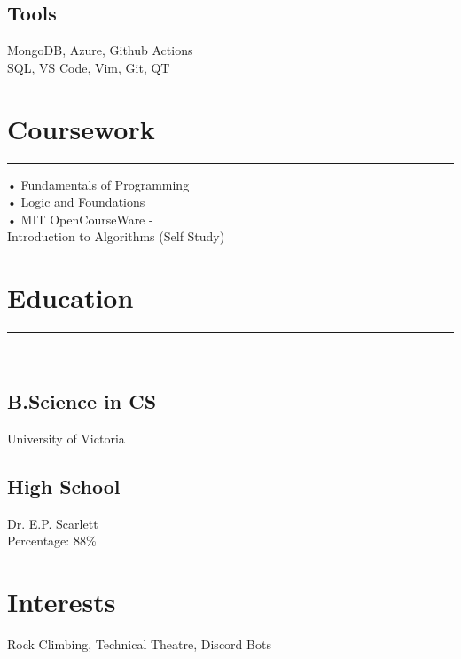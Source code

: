 \documentclass[]{rahulworld-resume}
\begin{document}
\begin{minipage}[t]{0.33\textwidth}
\subsection{Tools}
MongoDB, Azure, Github Actions \\ SQL, VS Code, Vim, Git, QT
\sectionsep
\section{Coursework}
\noindent\rule{5cm}{0.4pt}

• Fundamentals of Programming\\
• Logic and Foundations\\
• MIT OpenCourseWare - \\Introduction to Algorithms (Self Study)
\sectionsep
\section{Education} 
\noindent\rule{5cm}{0.4pt}\\
\subsection{B.Science in CS}
University of Victoria \\
\vspace{8pt}
\subsection{High School}
Dr. E.P. Scarlett\\
Percentage: 88\%
\section{Interests}
Rock Climbing, Technical Theatre, Discord Bots
\sectionsep
%
%

\end{minipage} 
\hfill
\end{document}

